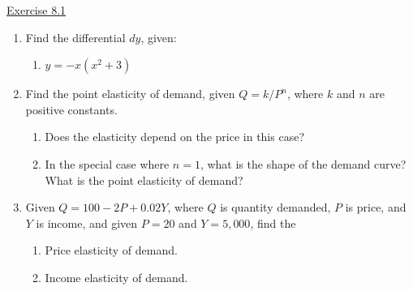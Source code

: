 \underline{Exercise 8.1}
\begin{enumerate}
\item[1.] Find the differential $dy$, given:
\begin{enumerate}
\item[(a)] $y=-x\left(x^{2}+3\right)$
\end{enumerate}

\item[4.] Find the point elasticity of demand, given $Q=k/P^{n}$, where $k$ and $n$ are positive constants.
\begin{enumerate}
\item[(a)] Does the elasticity depend on the price in this case?
\item[(b)] In the special case where $n=1$, what is the shape of the demand curve? What is the point elasticity of demand?
\end{enumerate}

\item[6.] Given $Q=100-2P+0.02Y$, where $Q$ is quantity demanded, $P$ is price, and $Y$ is income, and given $P=20$ and $Y=5{,}000$, find the
\begin{enumerate}
\item[(a)] Price elasticity of demand.
\item[(b)] Income elasticity of demand.
\end{enumerate}

\end{enumerate}

